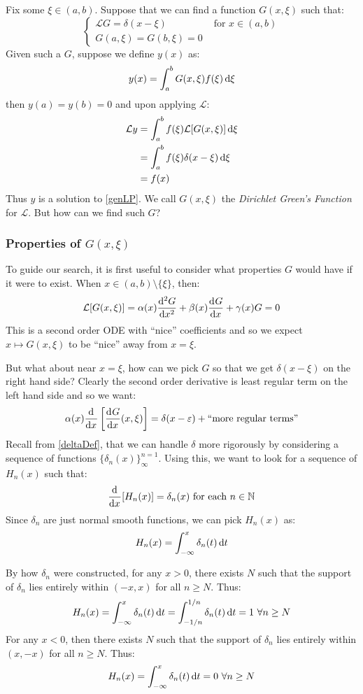 \documentclass[../main.tex]{subfiles}
\begin{document}
Fix some $\xi \in (a, b)$.
Suppose that we can find a function $G(x, \xi)$ such that:
\[
  \begin{cases}
  \mathcal{L} G = \delta(x - \xi) & \text{ for } x \in (a, b) \\
  G(a, \xi) = G(b, \xi) = 0 &
  \end{cases}
\]
Given such a $G$, suppose we define $y(x)$ as:
\begin{equation}
  y(x) = \int_{a}^{b} G(x, \xi) f(\xi) \d{\xi} \label{eqnGSol}
\end{equation}
then $y(a) = y(b) = 0$ and upon applying $\mathcal{L}$:
\begin{align*}
  \mathcal{L} y &= \int_{a}^{b} f(\xi) \mathcal{L}[G(x, \xi)] \d{\xi} \\
                &= \int_{a}^{b} f(\xi) \delta(x - \xi) \d{\xi} \\
                &= f(x)
\end{align*}
Thus $y$ is a solution to \cref{genLP}.
We call $G(x, \xi)$ the \textit{Dirichlet Green's Function} for $\mathcal{L}$.
But how can we find such $G$?

\subsubsection{Properties of $G(x, \xi)$}
To guide our search, it is first useful to consider what properties $G$ would have if it were to exist.
When $x \in (a, b) \setminus \{\xi\}$, then:
\[
  \mathcal{L}[G(x, \xi)] = \alpha(x) \deriv[2]{G}{x} + \beta(x) \deriv{G}{x} + \gamma(x)G = 0
\]
This is a second order ODE with ``nice'' coefficients and so we expect $x \mapsto G(x, \xi)$ to be ``nice'' away from $x = \xi$.

But what about near $x = \xi$, how can we pick $G$ so that we get $\delta(x - \xi)$ on the right hand side?
Clearly the second order derivative is least regular term on the left hand side and so we want:
\[
  \alpha(x) \deriv{}{x}\left[\deriv{G}{x}(x, \xi)\right] = \delta(x - \varepsilon) + \text{``more regular terms''}
\]
Recall from \cref{deltaDef}, that we can handle $\delta$ more rigorously by considering a sequence of functions $\{\delta_n(x)\}^{n = 1}_{\infty}$.
Using this, we want to look for a sequence of $H_n(x)$ such that:
\[
  \deriv{}{x}[H_n(x)] = \delta_n(x) \text{ for each } n \in \N
\]
Since $\delta_n$ are just normal smooth functions, we can pick $H_n(x)$ as:
\[
  H_n(x) = \int_{-\infty}^{x} \delta_n(t) \d{t}
\]

By how $\delta_n$ were constructed, for any $x > 0$, there exists $N$ such that the support of $\delta_n$ lies entirely within $(-x, x)$ for all $n \geq N$.
Thus:
\[
  H_n(x) = \int_{-\infty}^{x} \delta_n(t) \d{t} = \int_{-1/n}^{1/n} \delta_n(t) \d{t} = 1\ \forall n \geq N
\]
For any $x < 0$, then there exists $N$ such that the support of $\delta_n$ lies entirely within $(x, -x)$ for all $n \geq N$.
Thus:
\[
  H_n(x) = \int_{-\infty}^{x} \delta_n(t) \d{t} = 0\ \forall n \geq N
\]
\end{document}
